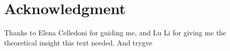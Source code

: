 \section*{Acknowledgment}
Thanks to Elena Celledoni for guiding me, and Lu Li for giving me the theoretical insight this text needed. And trygve%
